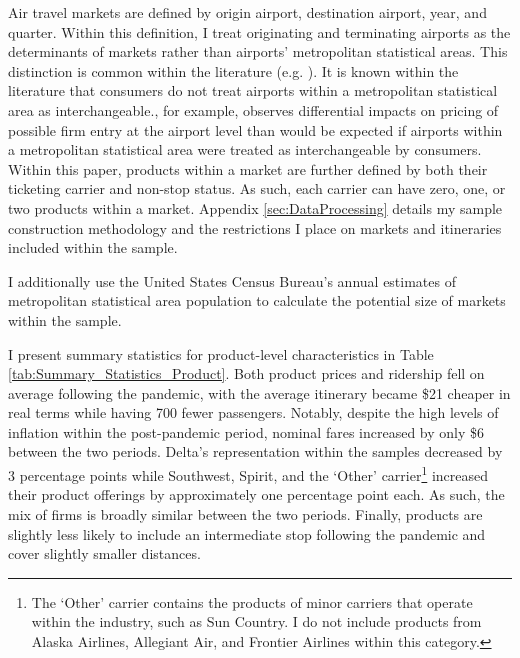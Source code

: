 \documentclass{article}
\begin{document}
	Air travel markets are defined by origin airport, destination airport, year, and quarter. Within this definition, I treat originating and terminating airports as the determinants of markets rather than airports' metropolitan statistical areas. This distinction is common within the literature (e.g. \citet{ciliberto_does_2014, luo_price_2014, tan_incumbent_2016,ciliberto_market_2021}). It is known within the literature that consumers do not treat airports within a metropolitan statistical area as interchangeable.\citet{goolsbee_how_2008}, for example, observes differential impacts on pricing of possible firm entry at the airport level than would be expected if airports within a metropolitan statistical area were treated as interchangeable by consumers. Within this paper, products within a market are further defined by both their ticketing carrier and non-stop status. As such, each carrier can have zero, one, or two products within a market. Appendix \ref{sec:DataProcessing} details my sample construction methodology and the restrictions I place on markets and itineraries included within the sample.
	
	I additionally use the United States Census Bureau's annual estimates of metropolitan statistical area population to calculate the potential size of markets within the sample. 

    I present summary statistics for product-level characteristics in Table \ref{tab:Summary_Statistics_Product}. Both product prices and ridership fell on average following the pandemic, with the average itinerary became \$21 cheaper in real terms while having 700 fewer passengers. Notably, despite the high levels of inflation within the post-pandemic period, nominal fares increased by only \$6 between the two periods.  Delta's representation within the samples decreased by 3 percentage points while Southwest, Spirit, and the `Other' carrier\footnote{The `Other' carrier contains the products of minor carriers that operate within the industry, such as Sun Country. I do not include products from Alaska Airlines, Allegiant Air, and Frontier Airlines within this category.} increased their product offerings by approximately one percentage point each. As such, the mix of firms is broadly similar between the two periods. Finally, products are slightly less likely to include an intermediate stop following the pandemic and cover slightly smaller distances. 
\end{document}
